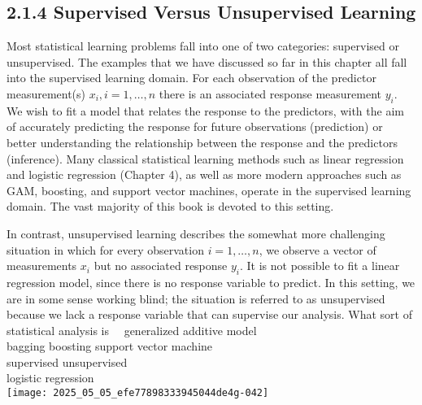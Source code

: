 \documentclass[10pt]{article}
\begin{document}
\subsection*{2.1.4 Supervised Versus Unsupervised Learning}
Most statistical learning problems fall into one of two categories: supervised or unsupervised. The examples that we have discussed so far in this chapter all fall into the supervised learning domain. For each observation of the predictor measurement(s) $x_{i}, i=1, \ldots, n$ there is an associated response measurement $y_{i}$. We wish to fit a model that relates the response to the predictors, with the aim of accurately predicting the response for future observations (prediction) or better understanding the relationship between the response and the predictors (inference). Many classical statistical learning methods such as linear regression and logistic regression (Chapter 4), as well as more modern approaches such as GAM, boosting, and support vector machines, operate in the supervised learning domain. The vast majority of this book is devoted to this setting.

In contrast, unsupervised learning describes the somewhat more challenging situation in which for every observation $i=1, \ldots, n$, we observe a vector of measurements $x_{i}$ but no associated response $y_{i}$. It is not possible to fit a linear regression model, since there is no response variable to predict. In this setting, we are in some sense working blind; the situation is referred to as unsupervised because we lack a response variable that can supervise our analysis. What sort of statistical analysis is\
\
generalized additive model\\
bagging boosting support vector machine\\
supervised unsupervised\\
logistic regression\\
\texttt{[image: 2025\_05\_05\_efe77898333945044de4g-042]}
\end{document}
